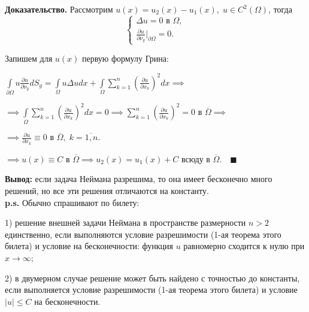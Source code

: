 \textbf{Доказательство.} Рассмотрим $u(x) = u_2(x) - u_1(x), \; u \in C^2(\Omega)$, тогда
\begin{equation*}
    \begin{cases}
    \Delta u = 0 \text{ в } \Omega, \\
    \frac{\partial u}{\partial \nu_y} \bigg |_{\partial \Omega} = 0.
    \end{cases}
\end{equation*}

Запишем для $u(x)$ первую формулу Грина:

$\int\limits_{\partial \Omega} u \frac{\partial u}{\partial \nu_y} dS_y = \int\limits_{\Omega} u \Delta u dx + \int\limits_\Omega \sum_{k=1}^n \left ( \frac{\partial u}{\partial x_k} \right )^2 dx \implies$

$\implies \int\limits_\Omega \sum_{k=1}^n \left ( \frac{\partial u}{\partial x_k} \right )^2 dx = 0 \implies \sum_{k=1}^n \left ( \frac{\partial u}{\partial x_k} \right )^2 = 0 \text{ в } \overline{\Omega} \implies$

$\implies \frac{\partial u}{\partial x_k} \equiv 0 \text{ в } \overline{\Omega}, \; k = \overline{1, n}.$

$\implies u(x) \equiv C$ в $\overline{\Omega} \implies u_2(x) = u_1(x) + C$ всюду в $\overline{\Omega}. \quad \blacksquare$

\textbf{Вывод:} если задача Неймана разрешима, то она имеет бесконечно много решений, но все эти решения отличаются на константу.\\

\textbf{p.s.} Обычно спрашивают по билету: 

1) решение внешней задачи Неймана в пространстве размерности $n > 2$ единственно, если выполняются условие разрешимости (1-ая теорема этого билета) и условие на бесконечности: функция $u$ равномерно сходится к нулю при $x \rightarrow \infty$; 

2) в двумерном случае решение может быть найдено с точностью до константы, если выполняется условие разрешимости (1-ая теорема этого билета) и условие $|u| \leq C$ на бесконечности.

